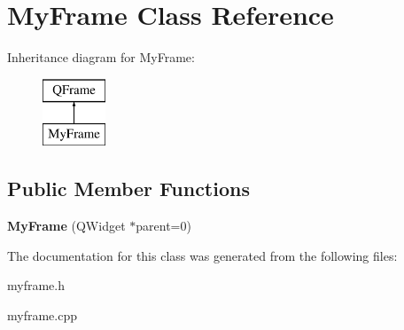 \hypertarget{class_my_frame}{\section{My\-Frame Class Reference}
\label{class_my_frame}
}
Inheritance diagram for My\-Frame\-:\begin{figure}[H]
\begin{center}
\leavevmode
\includegraphics[height=2.000000cm]{class_my_frame}
\end{center}
\end{figure}
\subsection*{Public Member Functions}
\begin{DoxyCompactItemize}
\item 
\hypertarget{class_my_frame_ac620dfbabcc47db73f7936236e898217}{{\bfseries My\-Frame} (Q\-Widget $\ast$parent=0)}\label{class_my_frame_ac620dfbabcc47db73f7936236e898217}

\end{DoxyCompactItemize}


The documentation for this class was generated from the following files\-:\begin{DoxyCompactItemize}
\item 
myframe.\-h\item 
myframe.\-cpp\end{DoxyCompactItemize}
